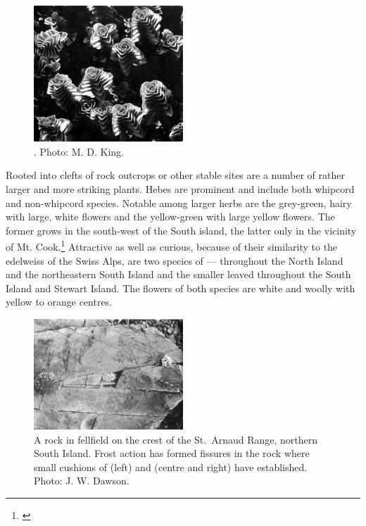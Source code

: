 \begin{figure}
	\includegraphics[width=0.5\textwidth]{graphics/figure106hebe.jpg}
	\centering
	\caption[\emph{Hebe epacridea}]{.
	Photo: M. D. King.}%
	\label{fig:106hebe}
\end{figure}

Rooted into clefts of rock outcrops or other stable sites are a number of rather larger and more striking plants.
Hebes are prominent and include both whipcord and non-whipcord species.
Notable among larger herbs are the grey-green, hairy  with large, white flowers and the yellow-green  with large yellow flowers.
The former grows in the south-west of the South island, the latter only in the vicinity of Mt.
Cook.\footnote{\cite{wilson1978wild}}
Attractive as well as curious, because of their similarity to the edelweiss of the Swiss Alps, are two species of  ---  throughout the North Island and the northeastern South Island and the smaller leaved  throughout the South Island and Stewart Island.
The flowers of both species are white and woolly with yellow to orange centres.

\begin{figure}
	\includegraphics[width=0.5\textwidth]{graphics/figure107fellfield-rock.jpg}
	\centering
	\caption[A rock in fellfield on the crest of the St.\ Arnaud Range]{A rock in fellfield on the crest of the St.\ Arnaud Range, northern South Island.
	Frost action has formed fissures in the rock where small cushions of  (left) and  (centre and right) have established.
	Photo: J. W. Dawson.}%
	\label{fig:107fellfield-rock}
\end{figure}

